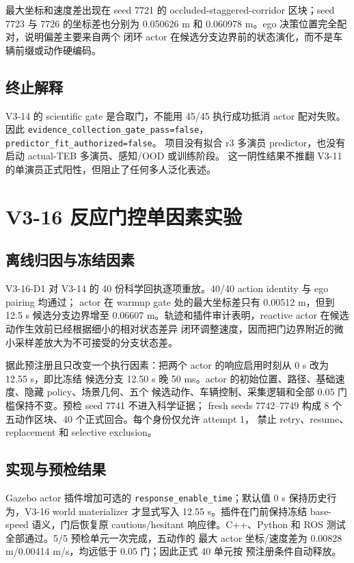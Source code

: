 \documentclass[12pt,a4paper,oneside]{report}
\newcommand{\code}[1]{\texttt{#1}}
\begin{document}
最大坐标和速度差出现在 seed 7721 的 occluded-staggered-corridor 区块；seed 7723 与 7726
的坐标差也分别为 0.050626 m 和 0.060978 m。ego 决策位置完全配对，说明偏差主要来自两个
闭环 actor 在候选分支边界前的状态演化，而不是车辆前缀或动作硬编码。

\section{终止解释}
V3-14 的 scientific gate 是合取门，不能用 45/45 执行成功抵消 actor 配对失败。因此
\code{evidence\_collection\_gate\_pass=false}，\code{predictor\_fit\_authorized=false}。
项目没有拟合 r3 多演员 predictor，也没有启动 actual-TEB 多演员、感知/OOD 或训练阶段。
这一阴性结果不推翻 V3-11 的单演员正式阳性，但阻止了任何多人泛化表述。

\chapter{V3-16 反应门控单因素实验}
\section{离线归因与冻结因素}
V3-16-D1 对 V3-14 的 40 份科学回执逐项重放。40/40 action identity 与 ego pairing 均通过；
actor 在 warmup gate 处的最大坐标差只有 0.00512 m，但到 12.5 s 候选分支边界增至
0.06607 m。轨迹和插件审计表明，reactive actor 在候选动作生效前已经根据细小的相对状态差异
闭环调整速度，因而把门边界附近的微小采样差放大为不可接受的分支状态差。

据此预注册且只改变一个执行因素：把两个 actor 的响应启用时刻从 0 s 改为 12.55 s，即比冻结
候选分支 12.50 s 晚 50 ms。actor 的初始位置、路径、基础速度、隐藏 policy、场景几何、五个
候选动作、车辆控制、采集逻辑和全部 0.05 门槛保持不变。预检 seed 7741 不进入科学证据；
fresh seeds 7742--7749 构成 8 个五动作区块、40 个正式回合。每个身份仅允许 attempt 1，
禁止 retry、resume、replacement 和 selective exclusion。

\section{实现与预检结果}
Gazebo actor 插件增加可选的 \code{response\_enable\_time}；默认值 0 s 保持历史行为，V3-16
world materializer 才显式写入 12.55 s。插件在门前保持冻结 base-speed 语义，门后恢复原
cautious/hesitant 响应律。C++、Python 和 ROS 测试全部通过。5/5 预检单元一次完成，五动作的
最大 actor 坐标/速度差为 0.00828 m/0.00414 m/s，均远低于 0.05 门；因此正式 40 单元按
预注册条件自动释放。
\end{document}
